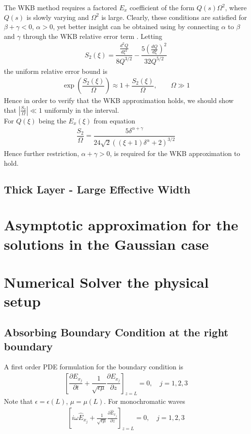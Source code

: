 \documentclass[twocolumn,secnumarabic,amssymb, nobibnotes, aps, prd]{revtex4-1}
\begin{document}
The WKB method requires a factored $E_x$ coefficient of the form $Q(s) \Omega^2$, where $Q(s)$ is slowly varying and $\Omega^2$ is large. Clearly, these conditions are satisfied for $\beta+\gamma<0$, $\alpha >0$, yet better insight can be obtained using by connecting $\alpha$ to $\beta$ and $\gamma$ through the WKB relative error term      
\cite{BenderOrszag1999}. Letting 
\begin{align}
S_2(\xi) = \dfrac{\frac{d^2 Q}{d \xi^2}}{8 Q^{3/2}} - \dfrac{5\left( \frac{d Q}{d \xi} \right)^2}{32 Q^{5/2}}
\end{align}
the uniform relative error bound is 
\begin{align}
\label{eqns:WKBErrXi}
\exp \left(\dfrac{S_2(\xi)}{\Omega} \right) \approx 1+\dfrac{S_2(\xi)}{\Omega}, \qquad \Omega \gg 1 
\end{align}
Hence in order to verify that the WKB approximation holds, we should show that $\left \vert \frac{S_2}{\Omega} \right \vert \ll 1$ uniformly in the interval. \\
For $Q(\xi)$ being the $E_x(\xi)$ from equation   
\begin{align}
\dfrac{S_2}{\Omega} = \dfrac{5 \delta ^{\alpha +\gamma }}{24 \sqrt{2} \left((\xi  +1)\delta ^{\alpha}+2\right)^{3/2}}
\end{align}
Hence further restriction, $\alpha + \gamma >0$, is required for the WKB approximation to hold.

\subsection{Thick Layer - Large Effective Width}

\section{Asymptotic approximation for the solutions in the Gaussian case}

\section{Numerical Solver the physical setup }
\subsection{Absorbing Boundary Condition at the right boundary}
 A first order PDE formulation for the boundary condition is
\begin{align}
\label{eqns:1_D-temporal-traveling-wave-bc}
\left[\dfrac{\partial E_{x_j}}{\partial t} +  \dfrac{1}{\sqrt{\epsilon \mu}}\dfrac{\partial E_{x_j}}{\partial z} \right ]_{z=L} = 0, \quad j=1,2,3
\end{align}
Note that $\epsilon=\epsilon(L)$, $\mu = \mu(L)$. For monochromatic waves
\begin{align}
\label{eqns:1_D-mc-traveling-wave-bc}
\left [ i \omega \hat{E}_{x_j} +  \frac{1}{\sqrt{\epsilon \mu}} \frac{\partial \hat{E}_{x_j}}{\partial z} \right ]_{z=L} = 0, \quad j=1,2,3
\end{align}
\end{document}
